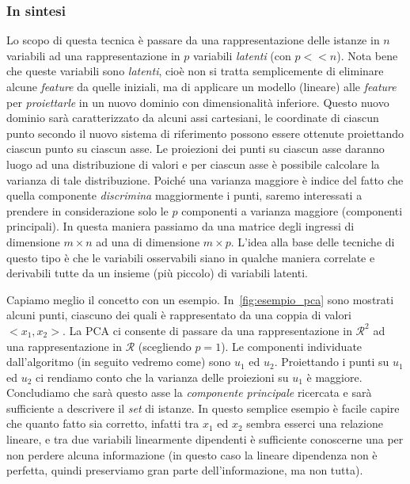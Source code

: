 \subsubsection{In sintesi}
Lo scopo di questa tecnica è passare da una rappresentazione delle istanze in $n$ variabili ad una rappresentazione in $p$ variabili \emph{latenti} (con $p<<n$). Nota bene che queste variabili sono \emph{latenti}, cioè non si tratta semplicemente di eliminare alcune \emph{feature} da quelle iniziali, ma di applicare un modello (lineare) alle \emph{feature} per \emph{proiettarle} in un nuovo dominio con dimensionalità inferiore. Questo nuovo dominio sarà caratterizzato da alcuni assi cartesiani, le coordinate di ciascun punto secondo il nuovo sistema di riferimento possono essere ottenute proiettando ciascun punto su ciascun asse. Le proiezioni dei punti su ciascun asse daranno luogo ad una distribuzione di valori e per ciascun asse è possibile calcolare la varianza di tale distribuzione. Poiché una varianza maggiore è indice del fatto che quella componente \emph{discrimina} maggiormente i punti, saremo interessati a prendere in considerazione solo le $p$ componenti a varianza maggiore (componenti principali). In questa maniera passiamo da una matrice degli ingressi di dimensione $m \times n$ ad una di dimensione $m \times p$. L'idea alla base delle tecniche di questo tipo è che le variabili osservabili siano in qualche maniera correlate e derivabili tutte da un insieme (più piccolo) di variabili latenti.

Capiamo meglio il concetto con un esempio. In~\autoref{fig:esempio_pca} sono mostrati alcuni punti, ciascuno dei quali è rappresentato da una coppia di valori $<x_1, x_2>$. La PCA ci consente di passare da una rappresentazione in $\mathcal{R}^2$ ad una rappresentazione in $\mathcal{R}$ (scegliendo $p=1$). Le componenti individuate dall'algoritmo (in seguito vedremo come) sono $u_1$ ed $u_2$. Proiettando i punti su $u_1$ ed $u_2$ ci rendiamo conto che la varianza delle proiezioni su $u_1$ è maggiore. Concludiamo che sarà questo asse la \emph{componente principale} ricercata e sarà sufficiente a descrivere il \emph{set} di istanze. In questo semplice esempio è facile capire che quanto fatto sia corretto, infatti tra $x_1$ ed $x_2$ sembra esserci una relazione lineare, e tra due variabili linearmente dipendenti è sufficiente conoscerne una per non perdere alcuna informazione (in questo caso la lineare dipendenza non è perfetta, quindi preserviamo gran parte dell'informazione, ma non tutta).

